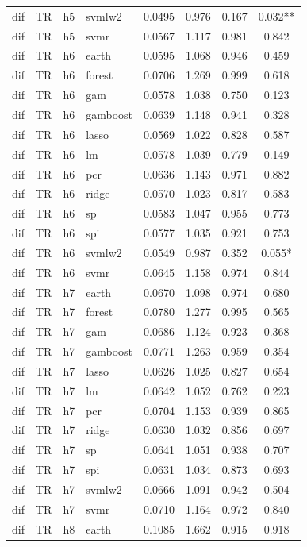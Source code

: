 \begin{ThreePartTable}
\begin{longtable}[t]{llclcccc}
dif & TR & h5 & svmlw2 & 0.0495 & 0.976 & 0.167 & 0.032**\\
dif & TR & h5 & svmr & 0.0567 & 1.117 & 0.981 & 0.842\\
\addlinespace
dif & TR & h6 & earth & 0.0595 & 1.068 & 0.946 & 0.459\\
dif & TR & h6 & forest & 0.0706 & 1.269 & 0.999 & 0.618\\
dif & TR & h6 & gam & 0.0578 & 1.038 & 0.750 & 0.123\\
dif & TR & h6 & gamboost & 0.0639 & 1.148 & 0.941 & 0.328\\
dif & TR & h6 & lasso & 0.0569 & 1.022 & 0.828 & 0.587\\
dif & TR & h6 & lm & 0.0578 & 1.039 & 0.779 & 0.149\\
dif & TR & h6 & pcr & 0.0636 & 1.143 & 0.971 & 0.882\\
dif & TR & h6 & ridge & 0.0570 & 1.023 & 0.817 & 0.583\\
dif & TR & h6 & sp & 0.0583 & 1.047 & 0.955 & 0.773\\
dif & TR & h6 & spi & 0.0577 & 1.035 & 0.921 & 0.753\\
dif & TR & h6 & svmlw2 & 0.0549 & 0.987 & 0.352 & 0.055*\\
dif & TR & h6 & svmr & 0.0645 & 1.158 & 0.974 & 0.844\\
\addlinespace
dif & TR & h7 & earth & 0.0670 & 1.098 & 0.974 & 0.680\\
dif & TR & h7 & forest & 0.0780 & 1.277 & 0.995 & 0.565\\
dif & TR & h7 & gam & 0.0686 & 1.124 & 0.923 & 0.368\\
dif & TR & h7 & gamboost & 0.0771 & 1.263 & 0.959 & 0.354\\
dif & TR & h7 & lasso & 0.0626 & 1.025 & 0.827 & 0.654\\
dif & TR & h7 & lm & 0.0642 & 1.052 & 0.762 & 0.223\\
dif & TR & h7 & pcr & 0.0704 & 1.153 & 0.939 & 0.865\\
dif & TR & h7 & ridge & 0.0630 & 1.032 & 0.856 & 0.697\\
dif & TR & h7 & sp & 0.0641 & 1.051 & 0.938 & 0.707\\
dif & TR & h7 & spi & 0.0631 & 1.034 & 0.873 & 0.693\\
dif & TR & h7 & svmlw2 & 0.0666 & 1.091 & 0.942 & 0.504\\
dif & TR & h7 & svmr & 0.0710 & 1.164 & 0.972 & 0.840\\
\addlinespace
dif & TR & h8 & earth & 0.1085 & 1.662 & 0.915 & 0.918\\

\end{longtable}
\end{ThreePartTable}
